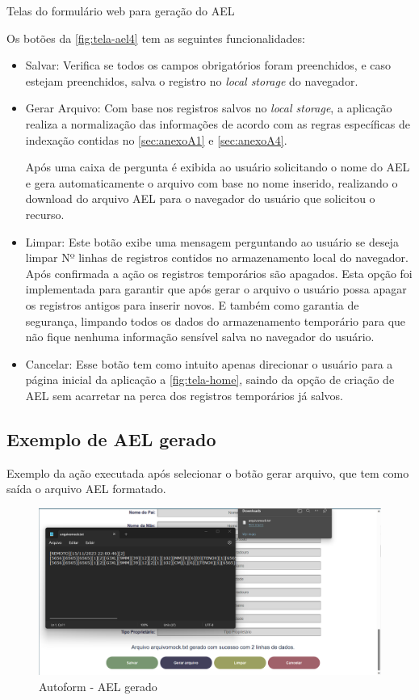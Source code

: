 Telas do formulário web para geração do AEL

Os botões da \autoref{fig:tela-ael4} tem as seguintes funcionalidades:
\begin{itemize}
    \item Salvar: Verifica se todos os campos obrigatórios foram preenchidos, e caso estejam preenchidos, salva o registro no \textit{local storage} do navegador.
    \item Gerar Arquivo: Com base nos registros salvos no \textit{local storage}, a aplicação realiza a normalização das informações de acordo com as regras específicas de indexação contidas no \autoref{sec:anexoA1} e \autoref{sec:anexoA4}.
     
    Após uma caixa de pergunta é exibida ao usuário solicitando o nome do AEL e gera automaticamente o arquivo com base no nome inserido, realizando o download do arquivo AEL para o navegador do usuário que solicitou o recurso. 
    \item Limpar: Este botão exibe uma mensagem perguntando ao usuário se deseja limpar Nº linhas de registros contidos no armazenamento local do navegador.  Após confirmada a ação os registros temporários são apagados. 
    Esta opção foi implementada para garantir que após gerar o arquivo o usuário possa apagar os registros antigos para inserir novos. E também como garantia de segurança, limpando todos os dados do armazenamento temporário para  que não fique nenhuma informação sensível salva no navegador do usuário.
    \item Cancelar: Esse botão tem como intuito apenas direcionar o usuário para a página inicial da aplicação a \autoref{fig:tela-home}, saindo da opção de criação de AEL sem acarretar na perca dos registros temporários já salvos.
\end{itemize}

\subsection{Exemplo de AEL gerado}
Exemplo da ação executada após selecionar o botão gerar arquivo, que tem como saída o arquivo AEL formatado.

\begin{figure}[H]
    \caption{\label{fig:tela-ael-gerado}Autoform - AEL gerado}
    \begin{center}
        \includegraphics[scale=0.45]{imagens/autoform-ael-gerado.png}
    \end{center}
\end{figure}

